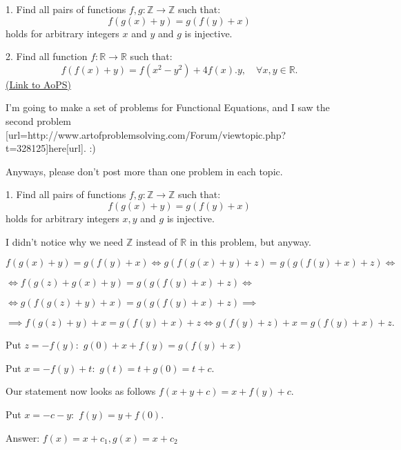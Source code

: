\begin{problem}
	1. Find all pairs of functions $f,g: \mathbb{Z} \to \mathbb{Z}$ such that: 
\[f(g(x)+y)=g(f(y)+x)\]
holds for arbitrary integers $x$ and $y$ and $g$ is injective.

2. Find all function $f: \mathbb{R} \to \mathbb{R}$ such that:
\[f(f(x)+y)=f(x^2-y^2)+4f(x).y,\quad \forall x,y \in \mathbb{R}.\]
	\flushright \href{https://artofproblemsolving.com/community/c6h411155}{(Link to AoPS)}
\end{problem}



\begin{solution}
	I'm going to make a set of problems for Functional Equations, and I saw the second problem [url=http://www.artofproblemsolving.com/Forum/viewtopic.php?t=328125]here[\/url]. :)

Anyways, please don't post more than one problem in each topic.
\end{solution}



\begin{solution}
	\begin{tcolorbox}1. Find all pairs of functions $f,g: \mathbb{Z} \to \mathbb{Z}$ such that: 
\[f(g(x)+y)=g(f(y)+x)\]
holds for arbitrary integers $x,y$ and $g$ is injective.\end{tcolorbox}
I didn't notice why we need $\mathbb{Z}$ instead of $\mathbb{R}$ in this problem, but anyway.

$f(g(x)+y)=g(f(y)+x)\Leftrightarrow g(f(g(x)+y)+z)=g(g(f(y)+x)+z)\Leftrightarrow$

$\Leftrightarrow f(g(z)+g(x)+y)=g(g(f(y)+x)+z) \Leftrightarrow$

$\Leftrightarrow g(f(g(z)+y)+x)=g(g(f(y)+x)+z)\implies$

$\implies f(g(z)+y)+x=g(f(y)+x)+z \Leftrightarrow g(f(y)+z)+x=g(f(y)+x)+z.$ 

Put $z=-f(y):$
$g(0)+x+f(y)=g(f(y)+x)$

Put $x=-f(y)+t:$
$g(t)=t+g(0)=t+c.$

Our statement now looks as follows
$f(x+y+c)=x+f(y)+c.$

Put $x=-c-y:$
$f(y)=y+f(0).$

\begin{bolded}Answer: $f(x)=x+c_1, g(x)=x+c_2$\end{bolded}
\end{solution}



